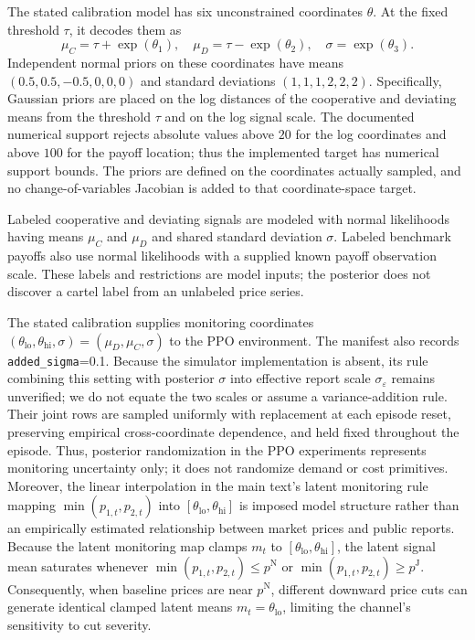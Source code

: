 \documentclass{article}
\begin{document}
The stated calibration model has six unconstrained coordinates $\theta$. At the fixed threshold $\tau$, it decodes them as
\[
\mu_C = \tau + \exp(\theta_1), \quad \mu_D = \tau - \exp(\theta_2), \quad \sigma = \exp(\theta_3).
\]
Independent normal priors on these coordinates have means $(0.5, 0.5, -0.5, 0, 0, 0)$ and standard deviations $(1, 1, 1, 2, 2, 2)$. Specifically, Gaussian priors are placed on the log distances of the cooperative and deviating means from the threshold $\tau$ and on the log signal scale. The documented numerical support rejects absolute values above $20$ for the log coordinates and above $100$ for the payoff location; thus the implemented target has numerical support bounds. The priors are defined on the coordinates actually sampled, and no change-of-variables Jacobian is added to that coordinate-space target.

Labeled cooperative and deviating signals are modeled with normal likelihoods having means $\mu_C$ and $\mu_D$ and shared standard deviation $\sigma$. Labeled benchmark payoffs also use normal likelihoods with a supplied known payoff observation scale. These labels and restrictions are model inputs; the posterior does not discover a cartel label from an unlabeled price series.

The stated calibration supplies monitoring coordinates $(\theta_{\mathrm{lo}},\theta_{\mathrm{hi}},\sigma)=(\mu_D,\mu_C,\sigma)$ to the PPO environment. The manifest also records \texttt{added\_sigma}=0.1. Because the simulator implementation is absent, its rule combining this setting with posterior $\sigma$ into effective report scale $\sigma_\varepsilon$ remains unverified; we do not equate the two scales or assume a variance-addition rule. Their joint rows are sampled uniformly with replacement at each episode reset, preserving empirical cross-coordinate dependence, and held fixed throughout the episode. Thus, posterior randomization in the PPO experiments represents monitoring uncertainty only; it does not randomize demand or cost primitives. Moreover, the linear interpolation in the main text's latent monitoring rule mapping $\min(p_{1,t},p_{2,t})$ into $[\theta_{\mathrm{lo}},\theta_{\mathrm{hi}}]$ is imposed model structure rather than an empirically estimated relationship between market prices and public reports. Because the latent monitoring map clamps $m_t$ to $[\theta_{\mathrm{lo}},\theta_{\mathrm{hi}}]$, the latent signal mean saturates whenever $\min(p_{1,t},p_{2,t}) \leq p^{\mathrm{N}}$ or $\min(p_{1,t},p_{2,t}) \geq p^{\mathrm{J}}$. Consequently, when baseline prices are near $p^{\mathrm{N}}$, different downward price cuts can generate identical clamped latent means $m_t = \theta_{\mathrm{lo}}$, limiting the channel's sensitivity to cut severity.
\end{document}
